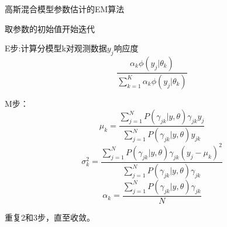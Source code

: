 \documentclass{article}
\begin{document}
	\begin{algorithm}[h]
		\caption{高斯混合模型参数估计的EM算法}
		\LinesNumbered
		取参数的初始值开始迭代
		
		E步:计算分模型k对观测数据$y_{j}$响应度 $$\frac{\alpha _{k}\phi \left ( y_{j}|\theta _{k} \right )}{\sum_{k=1}^{K}\alpha _{k}\phi \left ( y_{j}|\theta _{k} \right )} $$
		
		M步：$$\mu _{k}=\frac{\sum_{j=1}^{N}	P\left ( \gamma _{jk}|y,\theta  \right )\gamma _{jk}y_{j}}{\sum_{j=1}^{N}	P\left ( \gamma _{jk}|y,\theta  \right )y_{jk}}$$
		$$\sigma ^{2}_{k}=\frac{\sum_{j=1}^{N}	P\left ( \gamma _{jk}|y,\theta  \right )\gamma _{jk}\left ( y_{j}-\mu _{k} \right )^{2}}{\sum_{j=1}^{N}	P\left ( \gamma _{jk}|y,\theta  \right )\gamma _{jk}}$$
		$$\alpha_{k}=\frac{\sum_{j=1}^{N}P\left ( \gamma _{jk}|y,\theta  \right )\gamma _{jk}}{N}$$
		
		重复2和3步，直至收敛。
	\end{algorithm}
	
	
	
\end{document}
